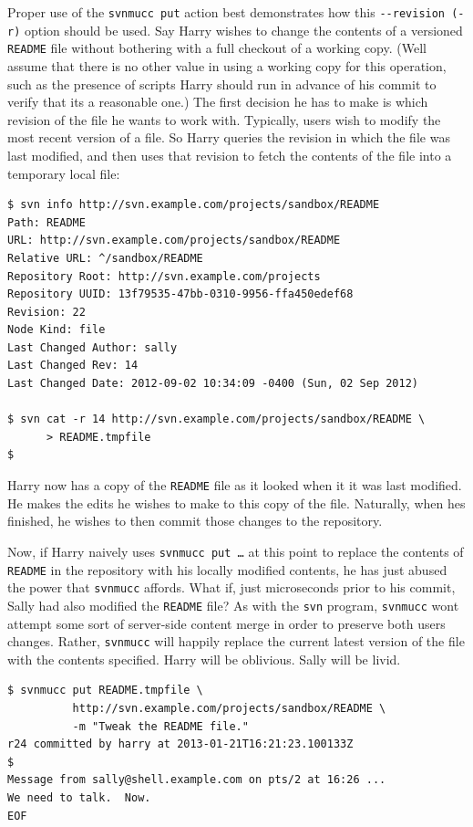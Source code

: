 Proper use of the \texttt{svnmucc\ put} action best demonstrates how
this \texttt{-\/-revision\ (-r)} option should be used. Say Harry wishes
to change the contents of a versioned \texttt{README} file without
bothering with a full checkout of a working copy. (We\textquotesingle ll
assume that there is no other value in using a working copy for this
operation, such as the presence of scripts Harry should run in advance
of his commit to verify that it\textquotesingle s a reasonable one.) The
first decision he has to make is which revision of the file he wants to
work with. Typically, users wish to modify the most recent version of a
file. So Harry queries the revision in which the file was last modified,
and then uses that revision to fetch the contents of the file into a
temporary local file:

\begin{verbatim}
$ svn info http://svn.example.com/projects/sandbox/README
Path: README
URL: http://svn.example.com/projects/sandbox/README
Relative URL: ^/sandbox/README
Repository Root: http://svn.example.com/projects
Repository UUID: 13f79535-47bb-0310-9956-ffa450edef68
Revision: 22
Node Kind: file
Last Changed Author: sally
Last Changed Rev: 14
Last Changed Date: 2012-09-02 10:34:09 -0400 (Sun, 02 Sep 2012)

$ svn cat -r 14 http://svn.example.com/projects/sandbox/README \
      > README.tmpfile
$
\end{verbatim}

Harry now has a copy of the \texttt{README} file as it looked when it it
was last modified. He makes the edits he wishes to make to this copy of
the file. Naturally, when he\textquotesingle s finished, he wishes to
then commit those changes to the repository.

Now, if Harry naively uses \texttt{svnmucc\ put\ …} at this point to
replace the contents of \texttt{README} in the repository with his
locally modified contents, he has just abused the power that
\texttt{svnmucc} affords. What if, just microseconds prior to his
commit, Sally had also modified the \texttt{README} file? As with the
\texttt{svn} program, \texttt{svnmucc} won\textquotesingle t attempt
some sort of server-side content merge in order to preserve both
users\textquotesingle{} changes. Rather, \texttt{svnmucc} will happily
replace the current latest version of the file with the contents
specified. Harry will be oblivious. Sally will be livid.

\begin{verbatim}
$ svnmucc put README.tmpfile \
          http://svn.example.com/projects/sandbox/README \
          -m "Tweak the README file."
r24 committed by harry at 2013-01-21T16:21:23.100133Z
$
Message from sally@shell.example.com on pts/2 at 16:26 ...
We need to talk.  Now.
EOF
\end{verbatim}

